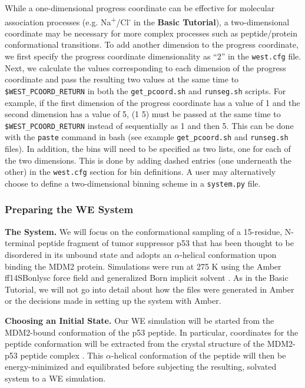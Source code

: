 While a one-dimensional progress coordinate can be effective for molecular association processes (e.g. Na\textsuperscript{+}/Cl\textsuperscript{-} in the \textbf{Basic Tutorial}), a two-dimensional coordinate may be necessary for more complex processes such as peptide/protein conformational transitions. 
To add another dimension to the progress coordinate, we first specify the progress coordinate dimensionality as “2” in the \verb|west.cfg| file. 
Next, we calculate the values corresponding to each dimension of the progress coordinate and pass the resulting two values at the same time to \verb|$WEST_PCOORD_RETURN| in both the \verb|get_pcoord.sh| and \verb|runseg.sh| scripts. 
For example, if the first dimension of the progress coordinate has a value of 1 and the second dimension has a value of 5, (1 5) must be passed at the same time to \verb|$WEST_PCOORD_RETURN| instead of sequentially as 1 and then 5. 
This can be done with the \verb|paste| command in bash (see example \verb|get_pcoord.sh| and \verb|runseg.sh| files). 
In addition, the bins will need to be specified as two lists, one for each of the two dimensions.
This is done by adding dashed entries (one underneath the other) in the \verb|west.cfg| section for bin definitions. 
A user may alternatively choose to define a two-dimensional binning scheme in a \verb|system.py| file.

\subsubsection{Preparing the WE System}
\label{tut:p53-int-prep}

\textbf{The System.} We will focus on  the conformational sampling of a 15-residue, N-terminal peptide fragment of tumor suppressor p53 that has been thought to be disordered in its unbound state and adopts an $\alpha$-helical conformation upon binding the MDM2 protein. 
Simulations were run at 275 K using the Amber ff14SBonlysc force field \citep{ff} and generalized Born implicit solvent \citep{implicit_solvent}. 
As in the Basic Tutorial, we will not go into detail about how the files were generated in Amber or the decisions made in setting up the system with Amber.

\textbf{Choosing an Initial State.} Our WE simulation will be started from the MDM2-bound conformation of the p53 peptide. 
In particular, coordinates for the peptide conformation will be extracted from the crystal structure of the MDM2-p53 peptide complex \citep{Kussie1996}. 
This $\alpha$-helical conformation of the peptide will then be energy-minimized and equilibrated before subjecting the resulting, solvated system to a WE simulation.

